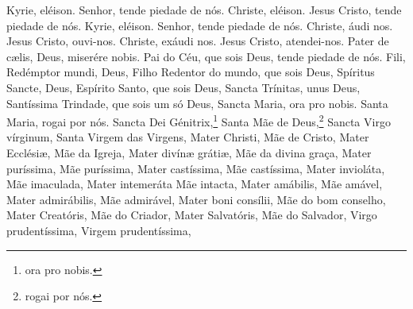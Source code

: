 \begin{nscenter}
\end{nscenter}

\begin{paracol}{2}
Kyrie, eléison.
\switchcolumn
Senhor, tende piedade de nós.
\switchcolumn*
Christe, eléison.
\switchcolumn
Jesus Cristo, tende piedade de nós.
\switchcolumn*
Kyrie, eléison.
\switchcolumn
Senhor, tende piedade de nós.
\switchcolumn*
Christe, áudi nos.
\switchcolumn
Jesus Cristo, ouvi-nos.
\switchcolumn*
Christe, exáudi nos.
\switchcolumn
Jesus Cristo, atendei-nos.
\switchcolumn*
Pater de cælis, Deus, miserére nobis.
\switchcolumn
Pai do Céu, que sois Deus, tende piedade de nós.
\switchcolumn*
Fili, Redémptor mundi, Deus,
\switchcolumn
Filho Redentor do mundo, que sois Deus,
\switchcolumn*
Spíritus Sancte, Deus,
\switchcolumn
Espírito Santo, que sois Deus,
\switchcolumn*
Sancta Trínitas, unus Deus,
\switchcolumn
Santíssima Trindade, que sois um só Deus,
\switchcolumn*
Sancta Maria, ora pro nobis.
\switchcolumn
Santa Maria, rogai por nós.
\switchcolumn*
Sancta Dei Génitrix,\footnote[2]{ora pro nobis.\label{ora}}
\switchcolumn
Santa Mãe de Deus,\footnote[2]{rogai por nós.\label{rogai}}
\switchcolumn*
Sancta Virgo vírginum,
\switchcolumn
Santa Virgem das Virgens,
\switchcolumn*
Mater Christi,
\switchcolumn
Mãe de Cristo,
\switchcolumn*
Mater Ecclésiæ,
\switchcolumn
Mãe da Igreja,
\switchcolumn*
Mater divínæ grátiæ,
\switchcolumn
Mãe da divina graça,
\switchcolumn*
Mater puríssima,
\switchcolumn
Mãe puríssima,
\switchcolumn*
Mater castíssima,
\switchcolumn
Mãe castíssima,
\switchcolumn*
Mater invioláta,
\switchcolumn
Mãe imaculada,
\switchcolumn*
Mater intemeráta
\switchcolumn
Mãe intacta,
\switchcolumn*
Mater amábilis,
\switchcolumn
Mãe amável,
\switchcolumn*
Mater admirábilis,
\switchcolumn
Mãe admirável,
\switchcolumn*
Mater boni consílii,
\switchcolumn
Mãe do bom conselho,
\switchcolumn*
Mater Creatóris,
\switchcolumn
Mãe do Criador,
\switchcolumn*
Mater Salvatóris,
\switchcolumn
Mãe do Salvador,
\switchcolumn*
Virgo prudentíssima,
\switchcolumn
Virgem prudentíssima,

\end{paracol}

